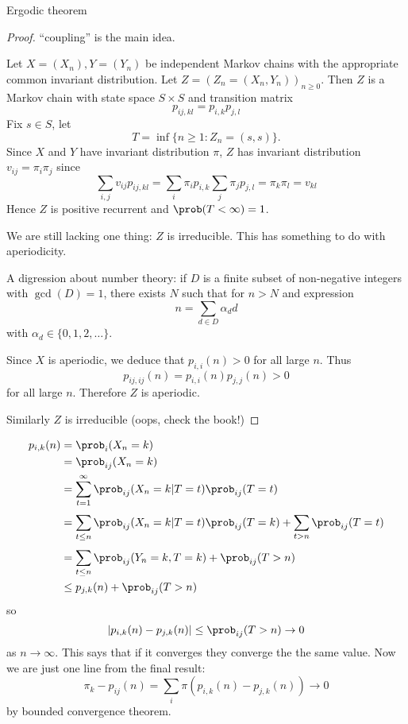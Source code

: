 \documentclass[a4paper]{article}
\begin{document}
Ergodic theorem

\begin{proof}
  ``coupling'' is the main idea.

  Let \(X = (X_n), Y = (Y_n)\) be independent Markov chains with the appropriate common invariant distribution. Let \(Z = (Z_n = (X_n, Y_n))_{n \geq 0}\). Then \(Z\) is a Markov chain with state space \(S \times S\) and transition matrix
  \[
    p_{ij, kl} = p_{i, k}p_{j, l}
  \]
  Fix \(s \in S\), let
  \[
    T = \inf \{n \geq 1: Z_n = (s, s)\}.
  \]
  Since \(X\) and \(Y\) have invariant distribution \(\pi\), \(Z\) has invariant distribution \(v_{ij} = \pi_i\pi_j\) since
  \[
    \sum_{i,j } v_{ij}p_{ij, kl} = \sum_i \pi_i p_{i, k} \sum_j \pi_j p_{j, l} = \pi_k \pi_l = v_{kl}
  \]
  Hence \(Z\) is positive recurrent and \(\prob(T < \infty) = 1\).

  We are still lacking one thing: \(Z\) is irreducible. This has something to do with aperiodicity.

  A digression about number theory: if \(D\) is a finite subset of non-negative integers with \(\gcd(D) = 1\), there exists \(N\) such that for \(n > N\) and expression
  \[
    n = \sum_{d \in D} \alpha_d d
  \]
  with \(\alpha_d \in \{0, 1, 2, \dots\}\).

  Since \(X\) is aperiodic, we deduce that \(p_{i,i}(n) > 0\) for all large \(n\). Thus
  \[
    p_{ij, ij}(n) = p_{i, i}(n)p_{j, j}(n) > 0
  \]
  for all large \(n\). Therefore \(Z\) is aperiodic.

  Similarly \(Z\) is irreducible (oops, check the book!)
\end{proof}

\begin{align*}
  p_{i, k}(n) &= \prob_i(X_n = k) \\
              &= \prob_{ij}(X_n = k) \\
              &= \sum_{t = 1}^{\infty} \prob_{ij}(X_n = k | T = t)\prob_{ij}(T = t) \\
              &= \sum_{t \leq n}^{ } \prob_{ij}(X_n = k | T = t) \prob_{ij}(T = k) + \sum_{t > n}^{ } \prob_{ij}(T = t) \\
              &= \sum_{t \leq n}^{ } \prob_{ij}(Y_n = k, T = k) + \prob_{ij}(T > n) \\
              &\leq p_{j, k}(n) + \prob_{ij}(T > n)
\end{align*}
so
\[
  |p_{i, k}(n) - p_{j, k}(n)| \leq \prob_{ij}(T > n) \to 0
\]
as \(n \to \infty\). This says that if it converges they converge the the same value. Now we are just one line from the final result:
\[
  \pi_k - p_{ij}(n) = \sum_{i}^{ } \pi(p_{i,k}(n) - p_{j, k}(n)) \to 0
\]
by bounded convergence theorem.
\end{document}

